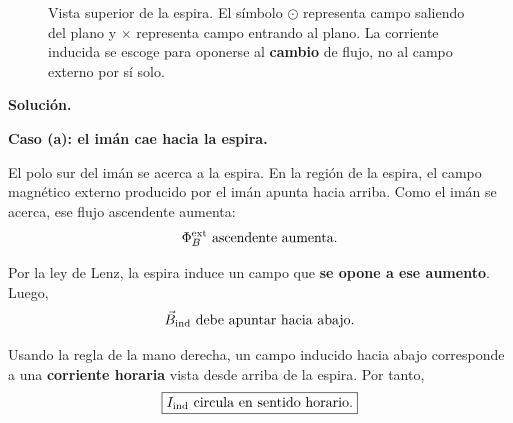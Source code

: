 \documentclass[11pt]{article}
\newcommand{\soluciontitulo}{%
  \par\medskip
  \noindent\textbf{Solución.}\par
  \smallskip
}
\newcommand{\paso}[1]{%
  \par\medskip
  \noindent\textbf{#1}\par
  \vspace{0.1em}%
}
\newcommand{\Bsale}[2]{%
    \draw[fieldblue,line width=0.55pt] (#1,#2) circle (0.11);
    \fill[fieldblue] (#1,#2) circle (0.03);
}
\begin{document}
\begin{figure}[H]
\caption{Vista superior de la espira. El s\'imbolo $\odot$ representa campo saliendo del plano y $\times$ representa campo entrando al plano. La corriente inducida se escoge para oponerse al \textbf{cambio} de flujo, no al campo externo por s\'i solo.}
\label{fig:p1_lenz}
\end{figure}


\soluciontitulo

\paso{Caso (a): el im\'an cae hacia la espira.}
El polo sur del im\'an se acerca a la espira. En la regi\'on de la espira, el campo magn\'etico externo producido por el im\'an apunta hacia arriba. Como el im\'an se acerca, ese flujo ascendente aumenta:
\begin{equation*}
    \Phi_B^{\rm ext}\ \text{ascendente aumenta}.
\end{equation*}

Por la ley de Lenz, la espira induce un campo que \textbf{se opone a ese aumento}. Luego,
\begin{equation*}
    \vec B_{\rm ind}\ \text{debe apuntar hacia abajo}.
\end{equation*}

Usando la regla de la mano derecha, un campo inducido hacia abajo corresponde a una \textbf{corriente horaria} vista desde arriba de la espira. Por tanto,
\begin{equation*}
    \boxed{I_{\rm ind}\ \text{circula en sentido horario}.}
\end{equation*}
\end{document}
